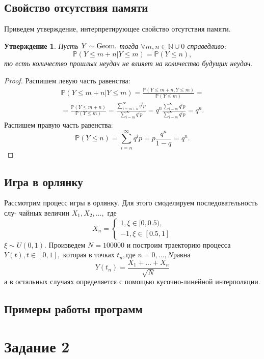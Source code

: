 \documentclass[11pt]{article}
\newtheorem{statement}{Утверждение}
\newtheorem{proof}{Доказательство}
\newcommand{\geom}{\normalfont{\text{Geom}}}
\numberwithin{equation}{section}
\begin{document}
\subsection{Свойство отсутствия памяти}
Приведем утверждение, интерпретирующее свойство отсутствия памяти.
\begin{statement}
  Пусть $Y \sim \geom,$ тогда $\forall m,n \in \mathbb{N} \cup {0}$ справедливо:
  $$\mathbb{P}(Y \leq m+n | Y \leq m) = \mathbb{P}(Y\leq n),$$
  то есть количество прошлых неудач не влияет на количество будущих неудач.
\end{statement}
\begin{proof}
  Распишем левую часть равенства:
  \begin{eqnarray}
    \mathbb{P}(Y \leq m+n | Y\leq m) = \frac{\mathbb{P}(Y\leq m+n, Y \leq m)}{\mathbb{P}(Y\leq m)} = \\
    = \frac{\mathbb{P}(Y \leq m+n)}{\mathbb{P}(Y \leq m)} = \frac{\sum_{i=m+n}^{\infty}q^i p}{\sum_{i=m}^{\infty}q^i p} = q^n\frac{\sum_{i=m}^{\infty}q^i p}{\sum_{i=m}^{\infty}q^i p} = q^n.
  \end{eqnarray}
  Распишем правую часть равенства:
  $$\mathbb{P}(Y\leq n) = \sum_{i=n}^{\infty}q^i p = p \frac{q^n}{1-q} = q^n. $$
\end{proof}
\subsection{Игра в орлянку}
Рассмотрим процесс игры в орлянку. Для этого смоделируем последовательность слу-
чайных величин $X_1, X_2, \dots, $ где 
\begin{equation}
  X_n =
  \begin{cases}
    1, \xi \in [0, 0.5),\\
    -1, \xi \in [0.5, 1]
  \end{cases}
\end{equation}
$\xi \sim U(0,1). $ Произведем $N=100000$ и построим траекторию процесса $Y(t), t \in [0,1],$
которая в точках $t_n, $где $n = 0, \dots, N равна$
$$ Y(t_n)= \frac{X_1+ \dots + X_n}{\sqrt{N}}$$
а в остальных случаях определяется с помощью кусочно-линейной интерполяции.
\subsection{Примеры работы программ}



\section{Задание 2}
\end{document}
